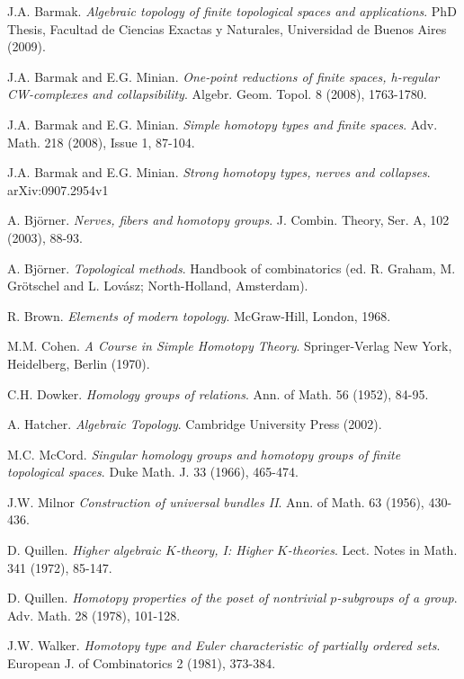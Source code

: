 \documentclass[11pt,twoside]{amsart}
\theoremstyle{plain}
\theoremstyle{remark}
\theoremstyle{definition}
\begin{document}
\begin{thebibliography}{99}

 J.A. Barmak. \textit{Algebraic topology of finite topological spaces and applications}.
		PhD Thesis, Facultad de Ciencias Exactas y Naturales, Universidad de Buenos Aires (2009).

 J.A. Barmak and E.G. Minian. \textit{One-point reductions of finite spaces, h-regular CW-complexes and collapsibility}.
		Algebr. Geom. Topol. 8 (2008), 1763-1780.

 J.A. Barmak and E.G. Minian. \textit{Simple homotopy types and finite spaces}.
		Adv. Math. 218 (2008), Issue 1, 87-104.

 J.A. Barmak and E.G. Minian. \textit{Strong homotopy types, nerves and collapses}.
		arXiv:0907.2954v1

 A. Bj\"orner. \textit{Nerves, fibers and homotopy groups}.
		J. Combin. Theory, Ser. A, 102 (2003), 88-93.

 A. Bj\"orner. \textit{Topological methods}.
		Handbook of combinatorics (ed. R. Graham, M. Gr\"otschel and L. Lov\'asz; North-Holland, Amsterdam).

 R. Brown. \textit{Elements of modern topology}.
		McGraw-Hill, London, 1968.

 M.M. Cohen. \textit{A Course in Simple Homotopy Theory}.
    Springer-Verlag New York, Heidelberg, Berlin (1970).

 C.H. Dowker. \textit{Homology groups of relations}.
		Ann. of Math. 56 (1952), 84-95.

 A. Hatcher. \textit{Algebraic Topology}.
		Cambridge University Press (2002).

 M.C. McCord. \textit{Singular homology groups and homotopy groups of finite topological spaces}.
    Duke Math. J. 33 (1966), 465-474.

 J.W. Milnor \textit{Construction of universal bundles II}.
	 Ann. of Math. 63 (1956), 430-436. 

 D. Quillen. \textit{Higher algebraic $K$-theory, I: Higher $K$-theories}.
		Lect. Notes in Math. 341 (1972), 85-147.

 D. Quillen. \textit{Homotopy properties of the poset of nontrivial $p$-subgroups of a group}.
		Adv. Math. 28 (1978), 101-128. 

 J.W. Walker. \textit{Homotopy type and Euler characteristic of partially ordered sets}.
		European J. of Combinatorics 2 (1981), 373-384.

\end{thebibliography}
\end{document}

